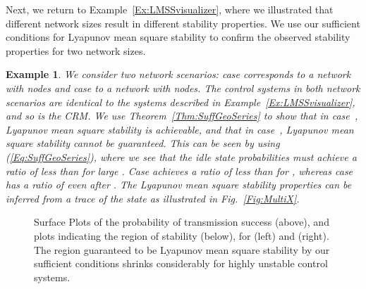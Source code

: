 \documentclass[twocolumn]{autart}
\newtheorem{example}{Example}[section]
\begin{document}
Next, we return to Example~\ref{Ex:LMSSvisualizer}, where we illustrated that different network sizes result in different stability properties. We use our sufficient conditions for Lyapunov mean square stability to confirm the observed stability properties for two network sizes.
\begin{example}\textbf{} \label{Ex:LMSSver}
We consider two network scenarios: case  corresponds to a network with  nodes and case  to a network with  nodes. The control systems in both network scenarios are identical to the systems described in Example~\ref{Ex:LMSSvisualizer}, and so is the CRM. We use Theorem~\ref{Thm:SuffGeoSeries} to show that in case~, Lyapunov mean square stability is achievable, and that in case~, Lyapunov mean square stability cannot be guaranteed. This can be seen by using (\ref{Eq:SuffGeoSeries}), where we see that the idle state probabilities must achieve a ratio of less than  for large . Case  achieves a ratio of less than  for , whereas case  has a ratio of  even after . The Lyapunov mean square stability properties can be inferred from a trace of the state  as illustrated in Fig.~\ref{Fig:MultiX}.
\end{example}

\begin{figure}[ptb]
\begin{center}
\caption{Surface Plots of the probability of transmission success (above), and plots indicating the region of stability (below), for  (left) and  (right). The region guaranteed to be Lyapunov mean square stability by our sufficient conditions shrinks considerably for highly unstable control systems.}
\end{center}
\end{figure}
\end{document}
